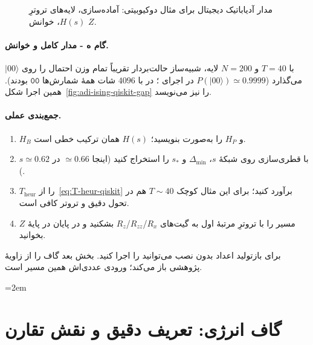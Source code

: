 
\begin{figure}[htbp]
	\centering
	\begin{latin}
		\resizebox{\ifdim\width>\textwidth\textwidth\else\width\fi}{!}{%
		}
	\end{latin}
	\caption{مدار آدیاباتیک دیجیتال برای مثال دوکیوبیتی: آماده‌سازی، لایه‌های تروترِ $H(s)$، خوانش $Z$.}
	\label{fig:adi-ising-trotter}
\end{figure}

\paragraph{گام ه - مدار کامل و خوانش.}
با $T=40$ و $N=200$ لایه، شبیه‌ساز حالت‌بردار تقریباً تمام وزن احتمال را روی $\lvert00\rangle$ می‌گذارد
($P(\lvert00\rangle)\simeq0.9999$ در اجرای
؛
در  با $4096$ شات همهٔ شمارش‌ها $\mathtt{00}$ بودند).
همین اجرا شکل~\ref{fig:adi-ising-qiskit-gap} را نیز می‌نویسد.


\paragraph{جمع‌بندی عملی.}
\begin{enumerate}
	\item $H_B$ و $H_P$ را به‌صورت  بنویسید؛ $H(s)$ همان ترکیب خطی است.
	\item با قطری‌سازی روی شبکهٔ $s$، $\Delta_{\min}$ و $s_*$ را استخراج کنید (اینجا $\simeq0.66$ در $s\simeq0.62$).
	\item $T_{\mathrm{heur}}$ را از~\eqref{eq:T-heur-qiskit} برآورد کنید؛ برای این مثال کوچک $T\sim40$ هم در تحول دقیق و تروتر کافی است.
	\item مسیر را با تروترِ مرتبهٔ اول به گیت‌های $R_x$/$R_{zz}$/$R_z$ بشکنید و در پایان در پایهٔ $Z$ بخوانید.
\end{enumerate}
برای بازتولید اعداد بدون نصب  می‌توانید
را اجرا کنید. بخش بعد گاف را از زاویهٔ پژوهشی باز می‌کند؛ ورودی عددی‌اش همین مسیر است.

\begingroup
\emergencystretch=2em


\section{گاف انرژی: تعریف دقیق و نقش تقارن}
\label{sec:gap-research}

